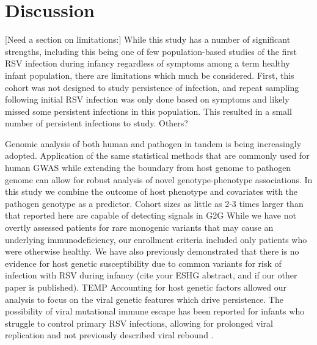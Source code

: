 \documentclass{article}
\begin{document}

\section{Discussion}

[Need a section on limitations:]
While this study has a number of significant strengths, including this being one of few population-based studies of the first RSV infection during infancy regardless of symptoms among a term healthy infant population, there are limitations which much be considered.
First, this cohort was not designed to study persistence of infection, and repeat sampling following initial RSV infection was only done based on symptoms and likely missed some persistent infections in this population. 
This resulted in a small number of persistent infections to study. Others?




Genomic analysis of both human and pathogen in tandem is being increasingly adopted. 
Application of the same statistical methods that are commonly used for human GWAS while
extending the boundary from host genome to pathogen genome can allow for robust analysis of novel genotype-phenotype associations.
In this study we combine the outcome of host phenotype and covariates with the 
pathogen genotype as a predictor. 
Cohort sizes as little as 2-3 times larger than that reported here are capable of detecting signals in G2G
\cite{fellay2020exploring}  %
While we have not overtly assessed patients for rare monogenic variants that may cause an underlying immunodeficiency, our enrollment criteria included only patients who were otherwise healthy.
We have also previously demonstrated that there is no evidence for host genetic susceptibility due to common variants for risk of infection with RSV during infancy 
(cite your ESHG abstract, and if our other paper is published).
TEMP
Accounting for host genetic factors allowed our analysis to focus on the viral genetic features which drive 
persistence.
The possibility of viral mutational immune escape has been reported for 
infants who struggle to control primary RSV infections, allowing for prolonged viral replication and not previously described viral rebound
\cite{brint2017prolonged}.
\end{document}
